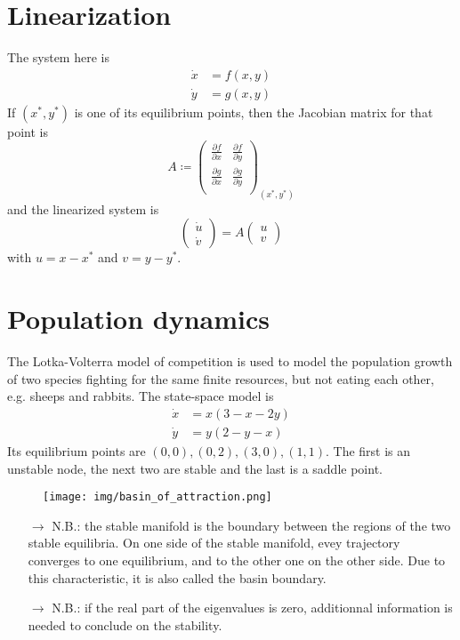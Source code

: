 \documentclass[12pt, openany]{report}
\theoremstyle{definition}
\begin{document}
\section{Linearization}
The system here is 
\begin{align}\label{eq:2D-CT}
    \dot x &= f(x,y)\nonumber \\
    \dot y &= g(x,y)
\end{align}
If \((x^*,y^*)\) is one of its equilibrium points, then the Jacobian matrix for that point is 
\begin{equation}
    A \coloneqq \begin{pmatrix}
        \frac{\partial f}{\partial x} & \frac{\partial f}{\partial y}\\
        \frac{\partial g}{\partial x} & \frac{\partial g}{\partial y}\\
    \end{pmatrix}_{(x^*,y^*)}
\end{equation}
and the linearized system is 
\begin{equation}
    \begin{pmatrix}
        \dot u\\ \dot v
    \end{pmatrix} = A \begin{pmatrix}
        u\\ v
    \end{pmatrix}
\end{equation}
with \(u=x-x^*\) and \(v=y-y^*\). 
\section{Population dynamics}
The Lotka-Volterra model of competition is used to model the population growth of two species fighting for the same finite resources, but not eating each other, e.g. sheeps and rabbits. The state-space model is
\begin{align}
    \dot x &= x(3-x-2y)\nonumber \\
    \dot y &= y(2-y-x)
\end{align}    
Its equilibrium points are \((0,0), (0,2),(3,0),(1,1)\). The first is an unstable node, the next two are stable and the last is a saddle point. 
\begin{figure}[H]
    \centering
    \texttt{[image: img/basin\_of\_attraction.png]}
\end{figure}
\begin{itemize}
    \item [\(\rightarrow\)] N.B.: the stable manifold is the boundary between the regions of the two stable equilibria. On one side of the stable manifold, evey trajectory converges to one equilibrium, and to the other one on the other side. Due to this characteristic, it is also called the basin boundary. 
    \item [\(\rightarrow\)] N.B.: if the real part of the eigenvalues is zero, additionnal information is needed to conclude on the stability. 
\end{itemize}
\end{document}
